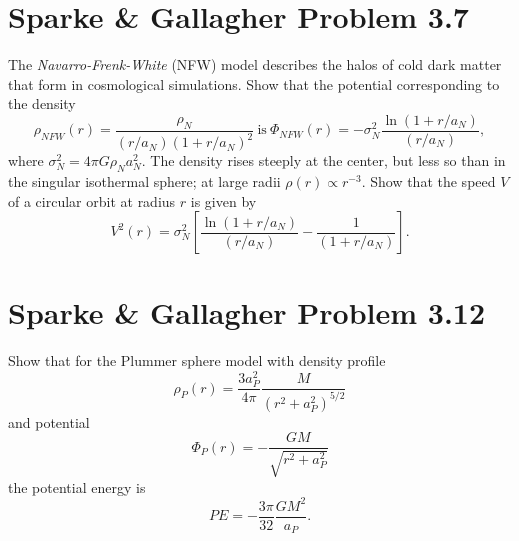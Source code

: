 \documentclass[]{article}
\begin{document}
\pagebreak

\section{Sparke \& Gallagher Problem 3.7}

The {\it Navarro-Frenk-White} (NFW) model describes the
halos of cold dark matter that form in cosmological simulations.
Show that the potential corresponding to the density
\begin{equation}
\rho_{NFW}(r) = \frac{\rho_N}{(r/a_N)(1+r/a_N)^2}~\mathrm{is}~\Phi_{NFW}(r) = -\sigma_N^2\frac{\ln(1+r/a_N)}{(r/a_N)},
\end{equation}
\noindent
where $\sigma_N^2 = 4\pi G \rho_N a_N^2$. The density rises steeply
at the center, but less so than in the singular isothermal sphere;
at large radii $\rho(r)\propto r^{-3}$. Show that the speed
$V$ of a circular orbit at radius $r$ is given
by
\begin{equation}
V^2(r) = \sigma_N^2\left[\frac{\ln(1+r/a_N)}{(r/a_N)} - \frac{1}{(1+r/a_N)}\right].
\end{equation}

\section{Sparke \& Gallagher Problem 3.12}

Show that for the Plummer sphere model with density profile
\begin{equation}
\rho_P(r) = \frac{3a_P^2}{4\pi}\frac{M}{(r^2 + a_P^2)^{5/2}}
\end{equation}
\noindent
and potential
\begin{equation}
\Phi_P(r) = -\frac{GM}{\sqrt{r^2 +a_P^2}}
\end{equation}
\noindent
the potential energy is
\begin{equation}
PE = - \frac{3\pi}{32} \frac{GM^2}{a_P}.
\end{equation}
\end{document}
